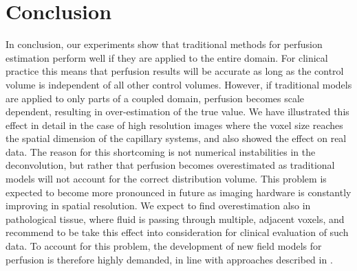 \documentclass[journal,twocolumn]{IEEEtran}
\begin{document}
	\section{Conclusion}
	In conclusion, our experiments show that traditional methods for perfusion estimation perform well if they are applied to the entire domain.
	For clinical practice this means that perfusion results will be accurate as long as the control volume is independent of all other control volumes.	
	However, if traditional models are applied to only parts of a coupled domain, perfusion becomes scale dependent, resulting in over-estimation of the true value.
	We have illustrated this effect in detail in the case of high resolution images where the voxel size reaches the spatial dimension of the capillary systems, and also showed the effect on real data.
		The reason for this shortcoming is not numerical instabilities in the deconvolution, but rather that perfusion becomes overestimated as traditional models will not account for the correct distribution volume.
  	This problem is expected to become more pronounced in future as imaging hardware is constantly improving in spatial resolution.
	We expect to find overestimation also in pathological tissue, where fluid is passing through multiple, adjacent voxels, and recommend to be take this effect into consideration for clinical evaluation of such data. To account for this problem, the development of new field models for perfusion is therefore highly demanded, in line with approaches described in \cite{sourbron14,Michler2013}. 	

	
		
	
\end{document}
